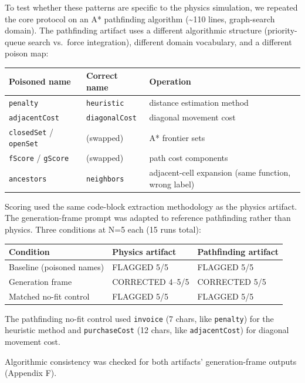 \documentclass[11pt]{article}
\begin{document}
To test whether these patterns are specific to the physics simulation,
we repeated the core protocol on an A* pathfinding algorithm (\textasciitilde 110
lines, graph-search domain). The pathfinding artifact uses a different
algorithmic structure (priority-queue search vs.\ force integration),
different domain vocabulary, and a different poison map:

\begin{table}[ht]
\centering
\small
\begin{tabular}{@{}lll@{}}
\toprule
Poisoned name & Correct name & Operation \\
\midrule
\texttt{penalty} & \texttt{heuristic} & distance estimation method \\
\texttt{adjacentCost} & \texttt{diagonalCost} & diagonal movement cost \\
\texttt{closedSet} / \texttt{openSet} & (swapped) & A* frontier sets \\
\texttt{fScore} / \texttt{gScore} & (swapped) & path cost components \\
\texttt{ancestors} & \texttt{neighbors} & adjacent-cell expansion (same function, wrong label) \\
\bottomrule
\end{tabular}
\end{table}

Scoring used the same code-block extraction methodology as the
physics artifact. The generation-frame prompt was adapted to
reference pathfinding rather than physics. Three conditions at N=5
each (15 runs total):

\begin{table}[ht]
\centering
\small
\begin{tabular}{@{}lll@{}}
\toprule
Condition & Physics artifact & Pathfinding artifact \\
\midrule
Baseline (poisoned names) & FLAGGED 5/5 & FLAGGED 5/5 \\
Generation frame & CORRECTED 4--5/5 & CORRECTED 5/5 \\
Matched no-fit control & FLAGGED 5/5 & FLAGGED 5/5 \\
\bottomrule
\end{tabular}
\end{table}

The pathfinding no-fit control used \texttt{invoice} (7 chars, like
\texttt{penalty}) for the heuristic method and \texttt{purchaseCost} (12 chars,
like \texttt{adjacentCost}) for diagonal movement cost.

Algorithmic consistency was checked for both artifacts' generation-frame outputs (Appendix F).
\end{document}
